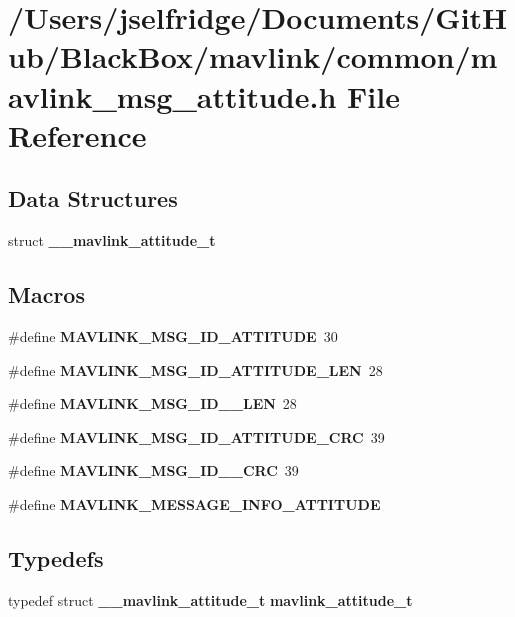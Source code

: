 \section{/\+Users/jselfridge/\+Documents/\+Git\+Hub/\+Black\+Box/mavlink/common/mavlink\+\_\+msg\+\_\+attitude.h File Reference}
\label{mavlink__msg__attitude_8h}
\subsection*{Data Structures}
\begin{DoxyCompactItemize}
\item 
struct \textbf{ \+\_\+\+\_\+mavlink\+\_\+attitude\+\_\+t}
\end{DoxyCompactItemize}
\subsection*{Macros}
\begin{DoxyCompactItemize}
\item 
\#define \textbf{ M\+A\+V\+L\+I\+N\+K\+\_\+\+M\+S\+G\+\_\+\+I\+D\+\_\+\+A\+T\+T\+I\+T\+U\+DE}~30
\item 
\#define \textbf{ M\+A\+V\+L\+I\+N\+K\+\_\+\+M\+S\+G\+\_\+\+I\+D\+\_\+\+A\+T\+T\+I\+T\+U\+D\+E\+\_\+\+L\+EN}~28
\item 
\#define \textbf{ M\+A\+V\+L\+I\+N\+K\+\_\+\+M\+S\+G\+\_\+\+I\+D\+\_\+\_\+\+L\+EN}~28
\item 
\#define \textbf{ M\+A\+V\+L\+I\+N\+K\+\_\+\+M\+S\+G\+\_\+\+I\+D\+\_\+\+A\+T\+T\+I\+T\+U\+D\+E\+\_\+\+C\+RC}~39
\item 
\#define \textbf{ M\+A\+V\+L\+I\+N\+K\+\_\+\+M\+S\+G\+\_\+\+I\+D\+\_\+\_\+\+C\+RC}~39
\item 
\#define \textbf{ M\+A\+V\+L\+I\+N\+K\+\_\+\+M\+E\+S\+S\+A\+G\+E\+\_\+\+I\+N\+F\+O\+\_\+\+A\+T\+T\+I\+T\+U\+DE}
\end{DoxyCompactItemize}
\subsection*{Typedefs}
\begin{DoxyCompactItemize}
\item 
typedef struct \textbf{ \+\_\+\+\_\+mavlink\+\_\+attitude\+\_\+t} \textbf{ mavlink\+\_\+attitude\+\_\+t}
\end{DoxyCompactItemize}


